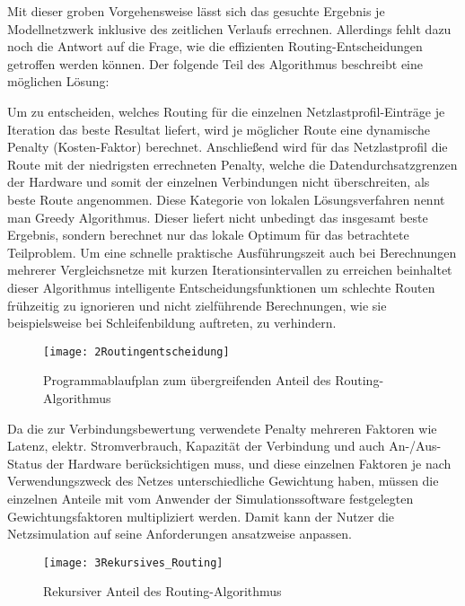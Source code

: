 Mit dieser groben Vorgehensweise lässt sich das gesuchte Ergebnis je Modellnetzwerk inklusive des zeitlichen Verlaufs errechnen. Allerdings fehlt dazu noch die Antwort auf die Frage, wie die effizienten Routing-Entscheidungen getroffen werden können. Der folgende Teil des Algorithmus beschreibt eine möglichen Lösung:


Um zu entscheiden, welches Routing für die einzelnen Netzlastprofil-Einträge je Iteration das beste Resultat liefert, wird je möglicher Route eine dynamische Penalty (Kosten-Faktor) berechnet. Anschließend wird für das Netzlastprofil die Route mit der niedrigsten errechneten Penalty, welche die Datendurchsatzgrenzen der Hardware und somit der einzelnen Verbindungen nicht überschreiten, als beste Route angenommen. Diese Kategorie von lokalen Lösungsverfahren nennt man Greedy Algorithmus. Dieser liefert nicht unbedingt das insgesamt beste Ergebnis, sondern berechnet nur das lokale Optimum für das betrachtete Teilproblem. Um eine schnelle praktische Ausführungszeit auch bei Berechnungen mehrerer Vergleichsnetze mit kurzen Iterationsintervallen zu erreichen beinhaltet dieser Algorithmus intelligente Entscheidungsfunktionen um schlechte Routen frühzeitig zu ignorieren und nicht zielführende Berechnungen, wie sie beispielsweise bei Schleifenbildung auftreten, zu verhindern.
\begin{figure}[ht]
	\centering
	\texttt{[image: 2Routingentscheidung]}
	\caption{Programmablaufplan zum übergreifenden Anteil des Routing-Algorithmus}
	\label{fig:2Routingentscheidung}
\end{figure}

Da die zur Verbindungsbewertung verwendete Penalty mehreren Faktoren wie Latenz, elektr. Stromverbrauch, Kapazität der Verbindung und auch An-/Aus-Status der Hardware berücksichtigen muss, und diese einzelnen Faktoren je nach Verwendungszweck des Netzes unterschiedliche Gewichtung haben, müssen die einzelnen Anteile mit vom Anwender der Simulationssoftware festgelegten Gewichtungsfaktoren multipliziert werden. Damit kann der Nutzer die Netzsimulation auf seine Anforderungen ansatzweise anpassen.
\begin{figure}[ht]
	\centering
	\texttt{[image: 3Rekursives\_Routing]}
	\caption{Rekursiver Anteil des Routing-Algorithmus}
	\label{fig:3Rekursives_Routing}
\end{figure}


